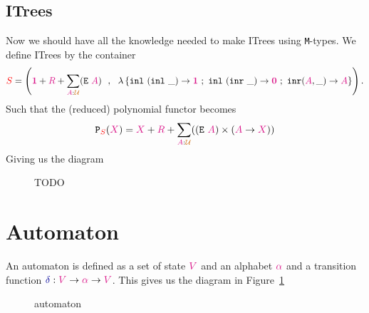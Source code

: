 \documentclass[twoside,11pt,openright]{report}
\theoremstyle{plain} %
\theoremstyle{definition}
\theoremstyle{remark}
\newcommand*{\figref}[1]{Figure~\ref{fig:#1}}
\newcommand*{\type}[1]{\textcolor{magenta!90!black}{#1}}
\newcommand*{\container}[1]{\textcolor{red}{#1}}
\newcommand*{\universe}[1]{\textcolor{orange!80!black}{#1}}
\newcommand*{\unit}{\type{\textbf{1}}}
\newcommand*{\empt}{\type{\textbf{0}}}
\newcommand*{\function}[1]{\textcolor{blue!60!black}{\ensuremath{\mathtt{#1}}}}
\newcommand*{\typeformer}[1]{\ensuremath{\mathtt{#1}}}
\newcommand*{\functor}[1]{\ensuremath{\mathbf{\mathtt{#1}}}}
\begin{document}
\subsection{ITrees}
Now we should have all the knowledge needed to make ITrees using \texttt{M}-types. We define ITrees by the container
\begin{equation}
  \container{S} = \left( \unit+\type{R}+\sum_{\type{A}:\universe{\mathcal{U}}} (\typeformer{E}~\type{A}) ~~,~~ \lambda\left\{ \texttt{inl}~(\texttt{inl}~\_) \rightarrow \unit ~;~ \texttt{inl}~(\texttt{inr}~\_) \rightarrow \empt ~;~ \texttt{inr} (\type{A},\_)  \rightarrow \type{A} \right\} \right).
\end{equation}
Such that the (reduced) polynomial functor becomes
\begin{equation}
  \functor{P}_{\container{S}}(\type{X}) = \type{X} + \type{R} + \sum_{\type{A} : \universe{\mathcal{U}}} ((\typeformer{E}~\type{A}) \times (\type{A} \rightarrow \type{X}))
\end{equation}
Giving us the diagram
\begin{figure}[h]
  \centering
  \caption{TODO}
\end{figure}

\section{Automaton}
An automaton is defined as a set of state \(\type{V}\) and an alphabet \(\type{\alpha}\) and a transition function \(\function{\delta} : \type{V} \rightarrow \type{\alpha} \rightarrow \type{V}\). This gives us the diagram in \figref{automaton}
\begin{figure}[h]
  \centering
  \caption{automaton}
  \label{fig:automaton}
\end{figure}
\end{document}
